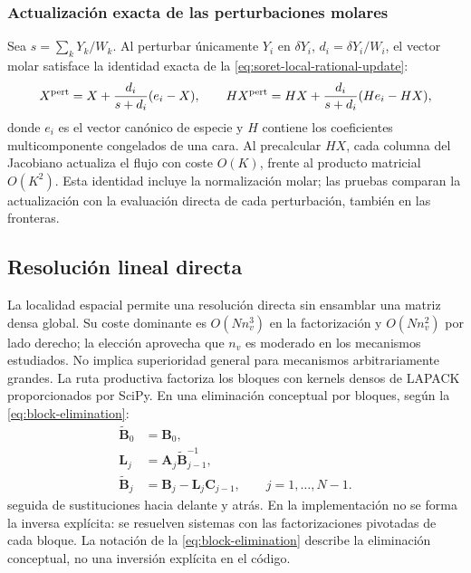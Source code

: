 \documentclass[12pt,a4paper,twoside,openany]{book}
\newcommand{\mat}[1]{\bm{#1}}
\begin{document}
\subsubsection{Actualización exacta de las perturbaciones molares}
Sea \(s=\sum_kY_k/W_k\). Al perturbar únicamente \(Y_i\) en \(\delta Y_i\),
\(d_i=\delta Y_i/W_i\), el vector molar satisface la identidad exacta de la \cref{eq:soret-local-rational-update}:
\begin{equation}
 X^{\rm pert}=X+\frac{d_i}{s+d_i}(e_i-X),\qquad
 H X^{\rm pert}=H X+\frac{d_i}{s+d_i}(H e_i-H X),
 \label{eq:soret-local-rational-update}
\end{equation}
donde \(e_i\) es el vector canónico de especie y \(H\) contiene los coeficientes multicomponente congelados de una cara.
Al precalcular \(HX\), cada columna del Jacobiano actualiza el flujo con coste
\(O(K)\), frente al producto matricial \(O(K^2)\). Esta identidad incluye la
normalización molar; las pruebas comparan la actualización con la evaluación
directa de cada perturbación, también en las fronteras.

\subsection{Resolución lineal directa}

La localidad espacial permite una resolución directa sin ensamblar una matriz
densa global. Su coste dominante es \(O(Nn_v^3)\) en la factorización y
\(O(Nn_v^2)\) por lado derecho; la elección aprovecha que \(n_v\) es moderado
en los mecanismos estudiados. No implica superioridad general para mecanismos
arbitrariamente grandes. La ruta productiva factoriza los bloques con kernels densos de LAPACK
proporcionados por SciPy. En una eliminación conceptual por bloques, según la \cref{eq:block-elimination}:
\begin{equation}
 \begin{aligned}
  \widetilde{\mat{B}}_0&=\mat{B}_0,\\
  \mat{L}_j&=\mat{A}_j\widetilde{\mat{B}}_{j-1}^{-1},\\
  \widetilde{\mat{B}}_j&=\mat{B}_j-\mat{L}_j\mat{C}_{j-1},
  \qquad j=1,\ldots,N-1.
 \end{aligned}
 \label{eq:block-elimination}
\end{equation}
seguida de sustituciones hacia delante y atrás. En la implementación no se
forma la inversa explícita: se resuelven sistemas con las factorizaciones
pivotadas de cada bloque. La notación de la \cref{eq:block-elimination} describe la
eliminación conceptual, no una inversión explícita en el código.
\end{document}
